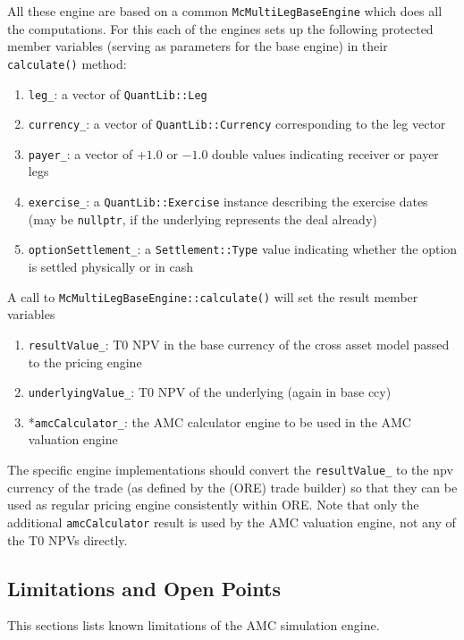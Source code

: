 All these engine are based on a common \verb+McMultiLegBaseEngine+ which does all the computations. For this each of the
engines sets up the following protected member variables (serving as parameters for the base engine) in their
\verb+calculate()+ method:

\begin{enumerate}
\item \verb+leg_+: a vector of \verb+QuantLib::Leg+
\item \verb+currency_+: a vector of \verb+QuantLib::Currency+ corresponding to the leg vector
\item \verb+payer_+: a vector of $+1.0$ or $-1.0$ double values indicating receiver or payer legs
\item \verb+exercise_+: a \verb+QuantLib::Exercise+ instance describing the exercise dates (may be \verb+nullptr+, if
  the underlying represents the deal already)
\item \verb+optionSettlement_+: a \verb+Settlement::Type+ value indicating whether the option is settled physically or
  in cash
\end{enumerate}

A call to \verb+McMultiLegBaseEngine::calculate()+ will set the result member variables

\begin{enumerate}
\item \verb+resultValue_+: T0 NPV in the base currency of the cross asset model passed to the pricing engine
\item \verb+underlyingValue_+: T0 NPV of the underlying (again in base ccy)
\item *\verb+amcCalculator_+: the AMC calculator engine to be used in the AMC valuation engine
\end{enumerate}

The specific engine implementations should convert the \verb+resultValue_+ to the npv currency of the trade (as defined
by the (ORE) trade builder) so that they can be used as regular pricing engine consistently within ORE. Note that only
the additional \verb+amcCalculator+ result is used by the AMC valuation engine, not any of the T0 NPVs directly.

\subsection{Limitations and Open Points}
\label{sec:amc_limitations}

This sections lists known limitations of the AMC simulation engine.

